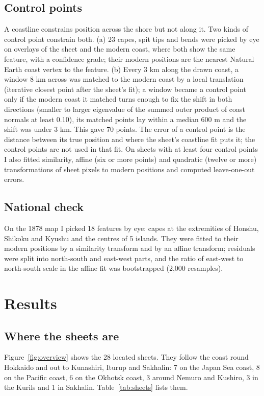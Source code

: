 \documentclass[11pt,a4paper]{article}
\begin{document}
\subsection{Control points}
A coastline constrains position across the shore but not along it. Two kinds of control point constrain both. (a) 23 capes, spit tips and bends were picked by eye on overlays of the sheet and the modern coast, where both show the same feature, with a confidence grade; their modern positions are the nearest Natural Earth coast vertex to the feature. (b) Every 3 km along the drawn coast, a window 8 km across was matched to the modern coast by a local translation (iterative closest point after the sheet's fit); a window became a control point only if the modern coast it matched turns enough to fix the shift in both directions (smaller to larger eigenvalue of the summed outer product of coast normals at least 0.10), its matched points lay within a median 600 m and the shift was under 3 km. This gave 70 points. The error of a control point is the distance between its true position and where the sheet's coastline fit puts it; the control points are not used in that fit. On sheets with at least four control points I also fitted similarity, affine (six or more points) and quadratic (twelve or more) transformations of sheet pixels to modern positions and computed leave-one-out errors.

\subsection{National check}
On the 1878 map I picked 18 features by eye: capes at the extremities of Honshu, Shikoku and Kyushu and the centres of 5 islands. They were fitted to their modern positions by a similarity transform and by an affine transform; residuals were split into north-south and east-west parts, and the ratio of east-west to north-south scale in the affine fit was bootstrapped (2,000 resamples).

\section{Results}
\subsection{Where the sheets are}
Figure~\ref{fig:overview} shows the 28 located sheets. They follow the coast round Hokkaido and out to Kunashiri, Iturup and Sakhalin: 7 on the Japan Sea coast, 8 on the Pacific coast, 6 on the Okhotsk coast, 3 around Nemuro and Kushiro, 3 in the Kurils and 1 in Sakhalin. Table~\ref{tab:sheets} lists them.
\end{document}
